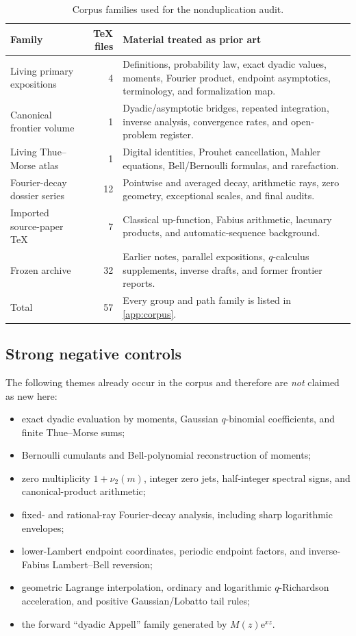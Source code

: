 \documentclass[11pt]{article}
\numberwithin{equation}{section}
\theoremstyle{definition}
\theoremstyle{remark}
\newcommand{\e}{\mathrm e}
\begin{document}
\begin{table}[H]
\centering
\caption{Corpus families used for the nonduplication audit.}
\label{tab:corpus-summary}
\begin{tabularx}{\textwidth}{@{}l r X@{}}
\toprule
Family & TeX files & Material treated as prior art \\
\midrule
Living primary expositions & 4 & Definitions, probability law, exact dyadic values, moments, Fourier product, endpoint asymptotics, terminology, and formalization map.\\
Canonical frontier volume & 1 & Dyadic/asymptotic bridges, repeated integration, inverse analysis, convergence rates, and open-problem register.\\
Living Thue--Morse atlas & 1 & Digital identities, Prouhet cancellation, Mahler equations, Bell/Bernoulli formulas, and rarefaction.\\
Fourier-decay dossier series & 12 & Pointwise and averaged decay, arithmetic rays, zero geometry, exceptional scales, and final audits.\\
Imported source-paper TeX & 7 & Classical up-function, Fabius arithmetic, lacunary products, and automatic-sequence background.\\
Frozen archive & 32 & Earlier notes, parallel expositions, $q$-calculus supplements, inverse drafts, and former frontier reports.\\
\midrule
Total & 57 & Every group and path family is listed in \cref{app:corpus}.\\
\bottomrule
\end{tabularx}
\end{table}

\subsection{Strong negative controls}

The following themes already occur in the corpus and therefore are \emph{not} claimed as new here:
\begin{itemize}
\item exact dyadic evaluation by moments, Gaussian $q$-binomial coefficients, and finite Thue--Morse sums;
\item Bernoulli cumulants and Bell-polynomial reconstruction of moments;
\item zero multiplicity $1+\nu_2(m)$, integer zero jets, half-integer spectral signs, and canonical-product arithmetic;
\item fixed- and rational-ray Fourier-decay analysis, including sharp logarithmic envelopes;
\item lower-Lambert endpoint coordinates, periodic endpoint factors, and inverse-Fabius Lambert--Bell reversion;
\item geometric Lagrange interpolation, ordinary and logarithmic $q$-Richardson acceleration, and positive Gaussian/Lobatto tail rules;
\item the forward ``dyadic Appell'' family generated by $M(z)\e^{xz}$.
\end{itemize}
\end{document}
